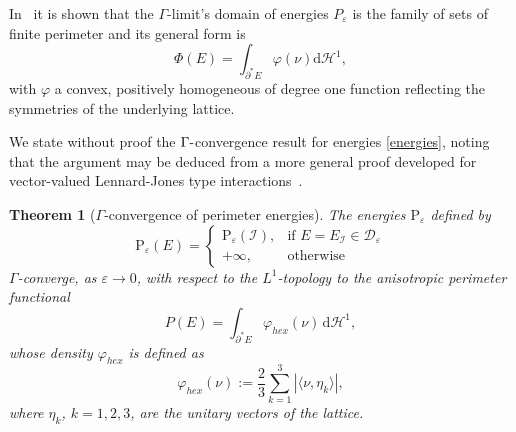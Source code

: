 \documentclass{interact}
\numberwithin{equation}{section}
\newtheorem{thm}{Theorem}[section]
\theoremstyle{definition}
\renewcommand{\H}{\mathcal{H}}
\newcommand{\I}{\mathcal{I}}
\renewcommand{\epsilon}{\varepsilon}
\def\e{\epsilon}
\begin{document}
In~\cite{ABC} it is shown that the $\Gamma$-limit's domain of energies $P_\varepsilon$ is the family of sets of finite perimeter and its general form is
$$
\Phi(E)=\int_{\partial^*E}\varphi(\nu)\mathrm{d}\H^1,
$$
with $\varphi$ a convex, positively homogeneous of degree one function reflecting the symmetries of the underlying lattice.

%

We state without proof %
the $\Gamma\hbox{-}$convergence result for energies \eqref{energies}, noting that the argument may be deduced from a more general proof developed for vector-valued Lennard-Jones type interactions~\cite[Proposition 4.6]{BG}.

\begin{thm} [$\Gamma$\hbox{-}convergence of perimeter energies]\label{thmconv}
The energies $\text{P}_\epsilon$ defined by
\begin{equation}
\text{P}_\epsilon(E)=
\begin{cases}
\text{P}_\epsilon(\I), &\text{if }E=E_{\I}\in\mathcal{D}_\epsilon\\
+\infty, & \text{otherwise}
\end{cases}
\end{equation}
$\Gamma$\hbox{-}converge, as $\epsilon\to0$, with respect to the $L^1$-topology to the anisotropic perimeter functional
\begin{equation}
P(E)=\int_{\partial^* E}\varphi_{hex}(\nu)\,\mathrm{d}\H^1,
\label{functionalhexa}
\end{equation}
whose density $\varphi_{hex}$ is defined as 
\begin{equation}
\varphi_{hex}(\nu):=\frac{2}{{3}}\sum_{k=1}^3|\langle \nu, \eta_k\rangle|,%
\label{minnorm}
\end{equation}
where $\eta_k$, $k=1,2,3$, are the unitary vectors of the lattice.
\end{thm}
\end{document}
